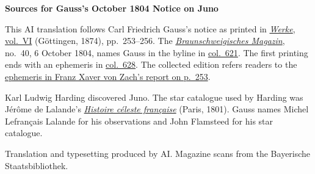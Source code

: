 \clearpage\thispagestyle{empty}
\begin{center}\textbf{Sources for Gauss’s October 1804 Notice on Juno}\end{center}
\noindent This AI translation follows Carl Friedrich Gauss’s notice as printed in \href{https://gdz.sub.uni-goettingen.de/id/PPN236007467}{\textit{Werke}, vol.~VI} (Göttingen, 1874), pp.~253--256. The \href{https://digipress.digitale-sammlungen.de/view/bsb10531607_00329_u001}{\textit{Braunschweigisches Magazin}}, no.~40, 6 October 1804, names Gauss in the byline in \href{https://www.digitale-sammlungen.de/en/view/bsb10531607?page=329}{col.~621}. The first printing ends with an ephemeris in \href{https://www.digitale-sammlungen.de/en/view/bsb10531607?page=332}{col.~628}. The collected edition refers readers to the \hyperlink{native-258}{ephemeris in Franz Xaver von Zach’s report on p.~253}.
\par\smallskip\noindent Karl Ludwig Harding discovered Juno. The star catalogue used by Harding was Jérôme de Lalande’s \href{https://archive.org/download/histoireclestef00lalagoog/page/n12.jpg}{\textit{Histoire céleste française}} (Paris, 1801). Gauss names Michel Lefrançais Lalande for his observations and John Flamsteed for his star catalogue.
\par\smallskip\noindent Translation and typesetting produced by AI. Magazine scans from the Bayerische Staatsbibliothek.
\clearpage
